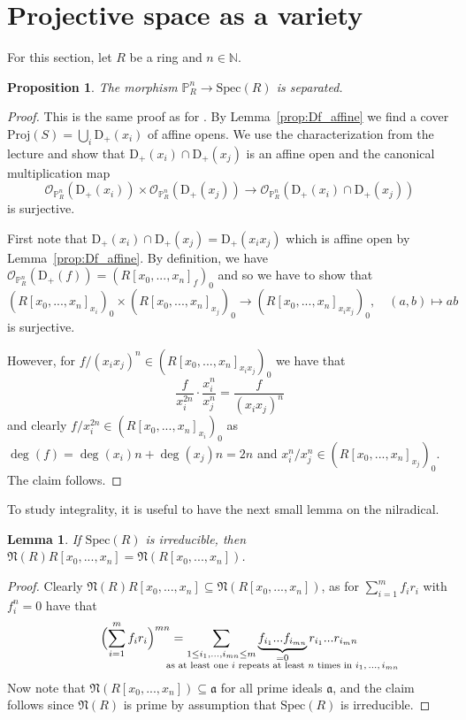 \documentclass{scrartcl}
\newcommand{\N}{\mathbb{N}}
\newcommand{\D}[1]{\mathrm{D}_+(#1)}
\renewcommand{\P}{\mathbb{P}}
\renewcommand{\a}{\mathfrak{a}}
\newcommand{\Nil}{\mathfrak{N}}
\newcommand{\Spec}{\mathrm{Spec}}
\newcommand{\Proj}{\mathrm{Proj}}
\renewcommand{\O}{\mathcal{O}}
\newcommand{\citestacks}[1]{\cite[\href{https://stacks.math.columbia.edu/tag/#1}{Tag #1}]{stacks}}
\newtheorem{prop}[subsection]{Proposition}
\newtheorem{lemma}[subsection]{Lemma}
\theoremstyle{definition}
\begin{document}
\section{Projective space as a variety}
For this section, let $R$ be a ring and $n \in \N$.
\begin{prop}
    The morphism $\P_R^n \to \Spec(R)$ is separated.
\end{prop}
\begin{proof}
    This is the same proof as for \citestacks{01MC}.
    By Lemma~\ref{prop:Df_affine} we find a cover $\Proj(S) = \bigcup_i \D{x_i}$ of affine opens.
    We use the characterization from the lecture and show that $\D{x_i} \cap \D{x_j}$ is an affine open and the canonical multiplication map
    \begin{equation*}
        \O_{\P_R^n}(\D{x_i}) \times \O_{\P_R^n}(\D{x_j}) \to \O_{\P_R^n}(\D{x_i} \cap \D{x_j})
    \end{equation*}
    is surjective.
    
    First note that $\D{x_i} \cap \D{x_j} = \D{x_ix_j}$ which is affine open by Lemma~\ref{prop:Df_affine}.
    By definition, we have $\O_{\P_R^n}(\D{f}) = (R[x_0, ..., x_n]_f)_0$ and so we have to show that
    \begin{equation*}
        (R[x_0, ..., x_n]_{x_i})_0 \times (R[x_0, ..., x_n]_{x_j})_0 \to (R[x_0, ..., x_n]_{x_ix_j})_0, \quad (a, b) \mapsto ab
    \end{equation*}
    is surjective.
    
    However, for $f/(x_ix_j)^n \in (R[x_0, ..., x_n]_{x_ix_j})_0$ we have that
    \begin{equation*}
        \frac f {x_i^{2n}} \cdot \frac {x_i^n} {x_j^n} = \frac f {(x_ix_j)^n}
    \end{equation*}
    and clearly $f/x_i^{2n} \in (R[x_0, ..., x_n]_{x_i})_0$ as $\deg(f) = \deg(x_i) n + \deg(x_j) n = 2n$ and $x_i^n/x_j^n \in (R[x_0, ..., x_n]_{x_j})_0$.
    The claim follows.
\end{proof}
To study integrality, it is useful to have the next small lemma on the nilradical.
\begin{lemma}
    \label{prop:nil_poly_ring}
    If $\Spec(R)$ is irreducible, then $\Nil(R)R[x_0, ..., x_n] = \Nil(R[x_0, ..., x_n])$.
\end{lemma}
\begin{proof}
    Clearly $\Nil(R)R[x_0, ..., x_n] \subseteq \Nil(R[x_0, ..., x_n])$, as for $\sum_{i = 1}^m f_i r_i$ with $f_i^n = 0$ have that
    \begin{equation*}
        \Bigl( \sum_{i = 1}^m f_i r_i \Bigr)^{m n} = \sum_{1 \leq i_1, ..., i_{mn} \leq m} \underbrace{f_{i_1} ... f_{i_{mn}}}_{\mathclap{\substack{= 0 \\ \text{as at least one $i$ repeats at least $n$ times in $i_1, ..., i_{mn}$}}}} r_{i_1} ... r_{i_mn}
    \end{equation*}
    Now note that $\Nil(R[x_0, ..., x_n]) \subseteq \a$ for all prime ideals $\a$, and the claim follows since $\Nil(R)$ is prime by assumption that $\Spec(R)$ is irreducible.
\end{proof}
\end{document}

